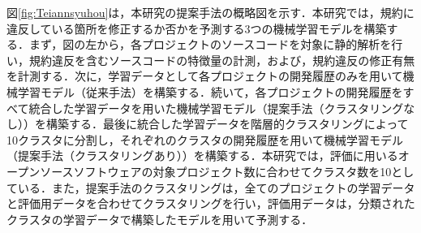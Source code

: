 \documentclass[T,J]{fose} %
\begin{document}
図\ref{fig:Teiannsyuhou}は，本研究の提案手法の概略図を示す．本研究では，規約に違反している箇所を修正するか否かを予測する3つの機械学習モデルを構築する．まず，図の左から，各プロジェクトのソースコードを対象に静的解析を行い，規約違反を含むソースコードの特徴量の計測，および，規約違反の修正有無を計測する．次に，学習データとして各プロジェクトの開発履歴のみを用いて機械学習モデル（従来手法）を構築する．続いて，各プロジェクトの開発履歴をすべて統合した学習データを用いた機械学習モデル（提案手法（クラスタリングなし））を構築する．最後に統合した学習データを階層的クラスタリングによって10クラスタに分割し，それぞれのクラスタの開発履歴を用いて機械学習モデル（提案手法（クラスタリングあり））を構築する．本研究では，評価に用いるオープンソースソフトウェアの対象プロジェクト数に合わせてクラスタ数を10としている．また，提案手法のクラスタリングは，全てのプロジェクトの学習データと評価用データを合わせてクラスタリングを行い，評価用データは，分類されたクラスタの学習データで構築したモデルを用いて予測する．





\end{document}
